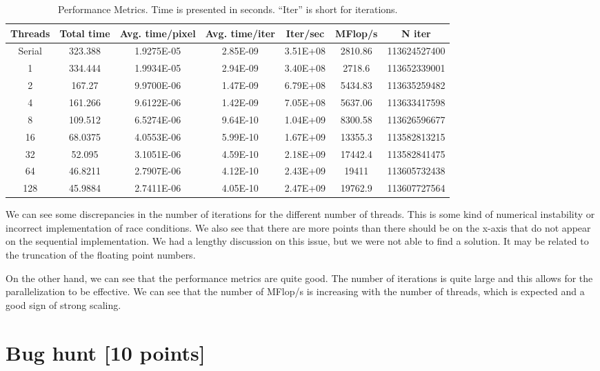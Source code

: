 \documentclass[unicode,11pt,a4paper,oneside,numbers=endperiod,openany]{scrartcl}
\begin{document}
\begin{table}[htbp]
  \centering
  \begin{tabular}{|c|c|c|c|c|c|c|}
  \hline
   Threads & Total time& Avg. time/pixel& Avg. time/iter& Iter/sec & MFlop/s &  N iter\\
  \hline
   Serial & 323.388 & 1.9275E-05 & 2.85E-09 & 3.51E+08 & 2810.86 & 113624527400\\
   1 & 334.444  & 1.9934E-05 & 2.94E-09 & 3.40E+08 & 2718.6 & 113652339001\\
   2 & 167.27  & 9.9700E-06 & 1.47E-09 & 6.79E+08 & 5434.83 & 113635259482\\
   4 & 161.266  & 9.6122E-06 & 1.42E-09 & 7.05E+08 & 5637.06 & 113633417598\\
   8 & 109.512  & 6.5274E-06 & 9.64E-10 & 1.04E+09 & 8300.58 & 113626596677\\
   16 & 68.0375  & 4.0553E-06 & 5.99E-10 & 1.67E+09 & 13355.3 & 113582813215\\
   32 & 52.095  & 3.1051E-06 & 4.59E-10 & 2.18E+09 & 17442.4 & 113582841475\\
   64 & 46.8211  & 2.7907E-06 & 4.12E-10 & 2.43E+09 & 19411 & 113605732438\\
   128 & 45.9884  & 2.7411E-06 & 4.05E-10 & 2.47E+09 & 19762.9 & 113607727564\\
  \hline
  \end{tabular}
  \caption{Performance Metrics. Time is presented in seconds. ``Iter'' is short for iterations.}
  \label{tab:performance_metrics}
  \end{table}

  We can see some discrepancies in the number of iterations for the different
  number of threads. This is some kind of numerical instability or incorrect
  implementation of race conditions. We also see that there are
  more points than there should be on the x-axis that do not appear on the
  sequential implementation. We had a lengthy discussion on
  this issue, but we were not able to find a solution. It may be related to the
  truncation of the floating point numbers.

  On the other hand, we can see that the performance metrics are quite good. The
  number of iterations is quite large and this allows for the parallelization to 
  be effective. We can see that the number of MFlop/s is increasing with the
  number of threads, which is expected and a good sign of strong scaling.

\section{Bug hunt [10 points]}
\end{document}

